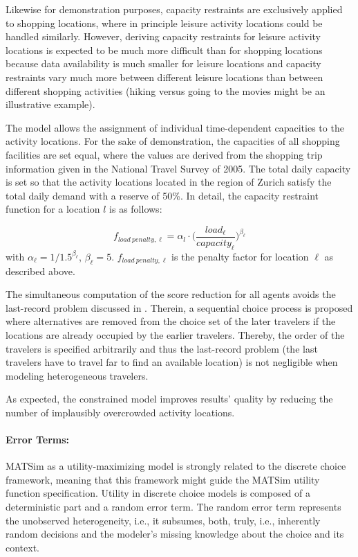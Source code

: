 Likewise for demonstration purposes, capacity restraints are exclusively applied to shopping locations, where in principle leisure activity locations could be handled similarly. However, deriving capacity restraints for leisure activity locations is expected to be much more difficult than for shopping locations because data availability is much smaller for leisure locations and capacity restraints vary much more between different leisure locations than between different shopping activities (hiking versus going to the movies might be an illustrative example).

The model allows the assignment of individual time-dependent capacities to the activity locations. For the sake of demonstration, the capacities of all shopping facilities are set equal, where the values are derived from the shopping trip information given in the National Travel Survey of 2005. The total daily capacity is set so that the activity locations located in the region of Zurich satisfy the total daily demand with a reserve of 50\%. In detail, the capacity restraint function for a location $l$ is as follows:

\[
f_{load\ penalty, \ell}=\alpha_l \cdot \Bigg(\frac{load_{\ell}}{capacity_{\ell}}\Bigg)^{\beta_\ell}
\]
with $\alpha_\ell=1/1.5^{\beta_\ell}$, $\beta_\ell=5$. $f_{load\ penalty, \ell}$ is the penalty factor for location $\ell$ as described above.

The simultaneous computation of the score reduction for all agents avoids the last-record problem discussed in \citet[][]{VovshaEtAl_TRR_2002}. Therein, a sequential choice process is proposed where alternatives are removed from the choice set of the later travelers if the locations are already occupied by the earlier travelers. Thereby, the order of the travelers is specified arbitrarily and thus the last-record problem (the last travelers have to travel far to find an available location) is not negligible when modeling heterogeneous travelers. 

As expected, the constrained model improves results' quality by reducing the number of implausibly overcrowded activity locations.

\paragraph{Error Terms:}
MATSim as a utility-maximizing model is strongly related to the discrete choice framework, meaning that this framework might guide the MATSim utility function specification. Utility in discrete choice models is composed of a deterministic part and a random error term. The random error term represents the unobserved heterogeneity, i.e., it subsumes, both, truly, i.e., inherently random decisions and the modeler's missing knowledge about the choice and its context. 

